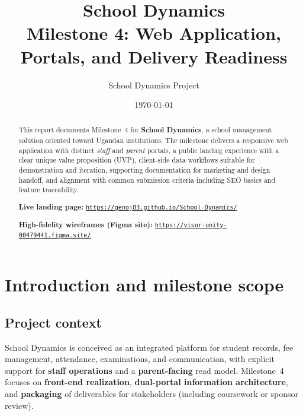 \documentclass[11pt,a4paper]{article}
\title{\textbf{School Dynamics}\\[0.35em]
\large Milestone 4: Web Application, Portals, and Delivery Readiness}
\author{School Dynamics Project}
\date{\today}
\newcommand{\PublishedLandingURL}{https://genoj83.github.io/School-Dynamics/}
\newcommand{\WireframesURL}{https://visor-unity-00479441.figma.site/}
\begin{document}
\maketitle

\begin{abstract}
\noindent
This report documents Milestone~4 for \textbf{School Dynamics}, a school management solution oriented toward Ugandan institutions. The milestone delivers a responsive web application with distinct \emph{staff} and \emph{parent} portals, a public landing experience with a clear unique value proposition (UVP), client-side data workflows suitable for demonstration and iteration, supporting documentation for marketing and design handoff, and alignment with common submission criteria including SEO basics and feature traceability.

\vspace{0.5em}
\noindent\textbf{Live landing page:} \href{\PublishedLandingURL}{\texttt{\PublishedLandingURL}}

\vspace{0.35em}
\noindent\textbf{High-fidelity wireframes (Figma site):} \href{\WireframesURL}{\texttt{\WireframesURL}}
\end{abstract}

\tableofcontents
\newpage

\section{Introduction and milestone scope}

\subsection{Project context}
School Dynamics is conceived as an integrated platform for student records, fee management, attendance, examinations, and communication, with explicit support for \textbf{staff operations} and a \textbf{parent-facing} read model. Milestone~4 focuses on \textbf{front-end realization}, \textbf{dual-portal information architecture}, and \textbf{packaging} of deliverables for stakeholders (including coursework or sponsor review).
\end{document}
